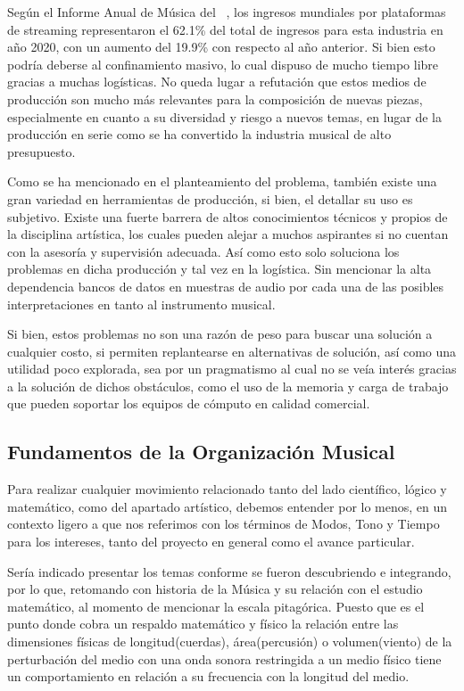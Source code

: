 \documentclass{book}
\begin{document}
	Según el Informe Anual de Música del ~\cite{ifpi2020}, los ingresos mundiales por plataformas de streaming representaron el 62.1\% del total de ingresos para esta industria en año 2020, con un aumento del 19.9\% con respecto al año anterior. Si bien esto podría deberse al confinamiento masivo, lo cual dispuso de mucho tiempo libre gracias a muchas logísticas. No queda lugar a refutación que estos medios de producción son mucho más relevantes para la composición de nuevas piezas, especialmente en cuanto a su diversidad y riesgo a nuevos temas, en lugar de la producción en serie como se ha convertido la industria musical de alto presupuesto.\par 
	
	Como se ha mencionado en el planteamiento del problema, también existe una gran variedad en herramientas de producción, si bien, el detallar su uso es subjetivo. Existe una fuerte barrera de altos conocimientos técnicos y propios de la disciplina artística, los cuales pueden alejar a muchos aspirantes si no cuentan con la asesoría y supervisión adecuada. Así como esto solo soluciona los problemas en dicha producción y tal vez en la logística. Sin mencionar la alta dependencia bancos de datos en muestras de audio por cada una de las posibles interpretaciones en tanto al instrumento musical.\par 
	
	Si bien, estos problemas no son una razón de peso para buscar una solución a cualquier costo, si permiten replantearse en alternativas de solución, así como una utilidad poco explorada, sea por un pragmatismo al cual no se veía interés gracias a la solución de dichos obstáculos, como el uso de la memoria y carga de trabajo que pueden soportar los equipos de cómputo en calidad comercial.\par  
	
	\pagebreak\subsection*{Fundamentos de la Organización Musical}
	Para realizar cualquier movimiento relacionado tanto del lado científico, lógico y matemático, como del apartado artístico, debemos entender por lo menos, en un contexto ligero a que nos referimos con los términos de Modos, Tono y Tiempo para los intereses, tanto del proyecto en general como el avance particular.\par
	
	Sería indicado presentar los temas conforme se fueron descubriendo e integrando, por lo que, retomando con historia  de la Música y su relación con el estudio matemático, al momento de mencionar la escala pitagórica. Puesto que es el punto donde cobra un respaldo matemático y físico la relación entre las dimensiones físicas de longitud(cuerdas), área(percusión) o volumen(viento) de la perturbación del medio con una onda sonora restringida a un medio físico tiene un comportamiento en relación a su frecuencia con la longitud del medio.\par 
	
\end{document}
